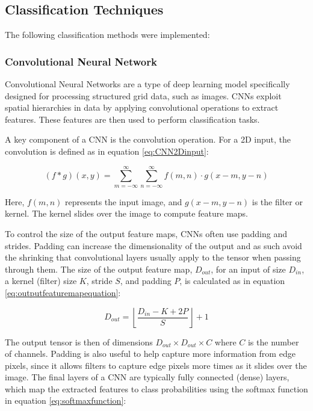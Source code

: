 \subsection{Classification Techniques}

The following classification methods were implemented:

\subsubsection{Convolutional Neural Network}

Convolutional Neural Networks are a type of deep learning model specifically designed for processing structured grid data, such as images. CNNs exploit spatial hierarchies in data by applying convolutional operations to extract features. These features are then used to perform classification tasks.

A key component of a CNN is the convolution operation. For a 2D input, the convolution is defined as in equation \ref{eq:CNN2Dinput}:

\begin{equation}
    (f * g)(x, y) = \sum_{m=-\infty}^{\infty} \sum_{n=-\infty}^{\infty} f(m, n) \cdot g(x - m, y - n)
    \label{eq:CNN2Dinput}
\end{equation}

Here, \(f(m, n)\) represents the input image, and \(g(x - m, y - n)\) is the filter or kernel. The kernel slides over the image to compute feature maps.

To control the size of the output feature maps, CNNs often use padding and strides. Padding can increase the dimensionality of the output and as such avoid the shrinking that convolutional layers usually apply to the tensor when passing through them. The size of the output feature map, \(D_{out}\), for an input of size \(D_{in}\), a kernel (filter) size \(K\), stride \(S\), and padding \(P\), is calculated as in equation \ref{eq:outputfeaturemapequation}:

\begin{equation}
    D_{out} = \left\lfloor\frac{D_{in} - K + 2P}{S}\right\rfloor + 1
    \label{eq:outputfeaturemapequation}
\end{equation}

The output tensor is then of dimensions $D_{out}\times D_{out}\times C$ where $C$ is the number of channels. Padding is also useful to help capture more information from edge pixels, since it allows filters to capture edge pixels more times as it slides over the image.
The final layers of a CNN are typically fully connected (dense) layers, which map the extracted features to class probabilities using the softmax function in equation \ref{eq:softmaxfunction}:

